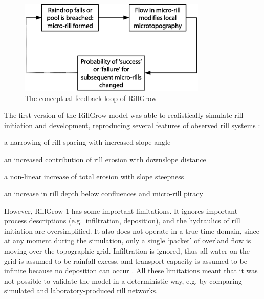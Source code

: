 \begin{figure}[htbp]
  \centering
    \includegraphics[width=0.80\textwidth]
{./img/rillgrow_feedback_concept}
  \caption[The conceptual feedback loop of RillGrow]{The conceptual
feedback loop of RillGrow \citep[From][]{favis-mortlock1998-353}}
  \label{fig:rillgrow_feedback_concept}
\end{figure}

The first version of the RillGrow model was able to realistically simulate rill
initiation and development, reproducing several features of observed rill
systems \citep{favis-mortlock1996-248,favis-mortlock1998-353}:
\begin{enumerate*}
  \item a narrowing of rill spacing with increased slope angle
  \item an increased contribution of rill erosion with downslope distance
  \item a non-linear increase of total erosion with slope steepness
  \item an increase in rill depth below confluences and micro-rill piracy
\end{enumerate*}

However, RillGrow 1 has some important limitations. It ignores important process
descriptions (e.g.\ infiltration, deposition), and the hydraulics of rill
initiation are oversimplified. It also does not operate in a true time domain,
since at any moment during the simulation, only a single `packet' of overland
flow is moving over the topographic grid. Infiltration is ignored, thus all
water on the grid is assumed to be rainfall excess, and transport capacity is
assumed to be infinite because no deposition can occur
\citep{favis-mortlock2000-2173}.
All these limitations meant that it was not possible to validate the model in a
deterministic way, e.g. by comparing simulated and laboratory-produced rill
networks.

